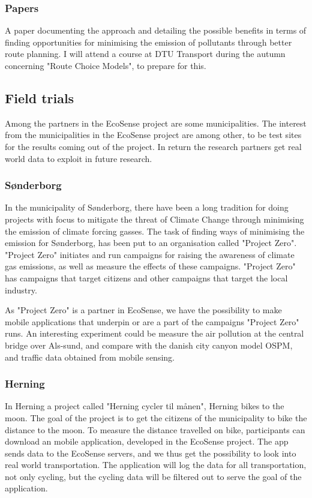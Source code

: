 \subsubsection{Papers}
A paper documenting the approach and detailing the possible benefits in terms of finding opportunities for minimising the emission of pollutants through better route planning. I will attend a course at DTU Transport during the autumn concerning "Route Choice Models", to prepare for this.
\subsection{Field trials}
Among the partners in the EcoSense project are some municipalities. The interest from the municipalities in the EcoSense project are among other, to be test sites for the results coming out of the project. In return the research partners get real world data to exploit in future research.
\subsubsection{S\o nderborg}
In the municipality of S\o nderborg, there have been a long tradition for doing projects with focus to mitigate the threat of Climate Change through minimising the emission of climate forcing gasses. The task of finding ways of minimising the emission for S\o nderborg, has been put to an organisation called "Project Zero". "Project Zero" initiates and run campaigns for raising the awareness of climate gas emissions, as well as measure the effects of these campaigns. "Project Zero" has campaigns that target citizens and other campaigns that target the local industry.

As "Project Zero" is a partner in EcoSense, we have the possibility to make mobile applications that underpin or are a part of the campaigns "Project Zero" runs. An interesting experiment could be measure the air pollution at the central bridge over Als-sund, and compare with the danish city canyon model OSPM, and traffic data obtained from mobile sensing.

\subsubsection{Herning}
In Herning a project called "Herning cycler til m\aa nen", Herning bikes to the moon. The goal of the project is to get the citizens of the municipality to bike the distance to the moon. To measure the distance travelled on bike, participants can download an mobile application, developed in the EcoSense project. The app sends data to the EcoSense servers, and we thus get the possibility to look into real world transportation. The application will log the data for all transportation, not only cycling, but the cycling data will be filtered out to serve the goal of the application. 

